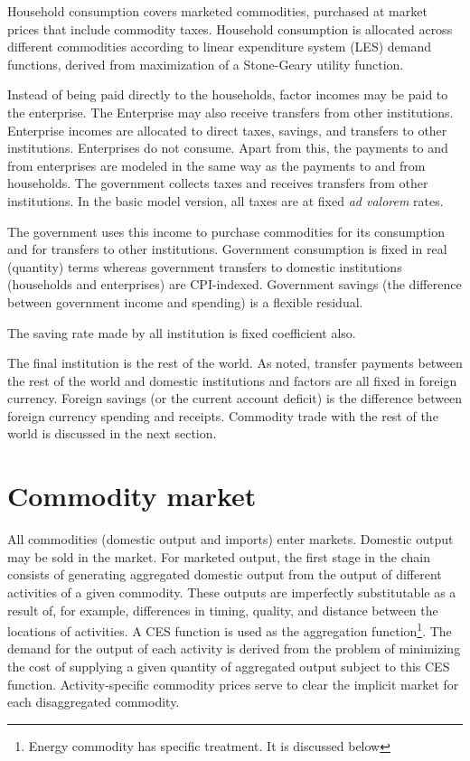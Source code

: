\documentclass[10pt,a4paper,titlepage,dvipdfmx]{book}
\begin{document}
Household consumption covers marketed commodities, purchased at market prices that include commodity taxes. Household consumption is allocated across different commodities according to linear expenditure system (LES) demand functions, derived from maximization of a Stone-Geary utility function.

Instead of being paid directly to the households, factor incomes may be paid to the enterprise. The Enterprise may also receive transfers from other institutions. Enterprise incomes are allocated to direct taxes, savings, and transfers to other institutions. Enterprises do not consume. Apart from this, the payments to and from enterprises are modeled in the same way as the payments to and from households. The government collects taxes and receives transfers from other institutions. In the basic model version, all taxes are at fixed \textit{ad valorem} rates. 

The government uses this income to purchase commodities for its consumption and for transfers to other institutions. Government consumption is fixed in real (quantity) terms whereas government transfers to domestic institutions (households and enterprises) are CPI-indexed. Government savings (the difference between government income and spending) is a flexible residual. 

The saving rate made by all institution is fixed coefficient also.

The final institution is the rest of the world. As noted, transfer payments between the rest of the world and domestic institutions and factors are all fixed in foreign currency. Foreign savings (or the current account deficit) is the difference between foreign currency spending and receipts. Commodity trade with the rest of the world is discussed in the next section. 

\section{\label{sec:ComMar}Commodity market}

All commodities (domestic output and imports) enter markets. Domestic output may be sold in the market. For marketed output, the first stage in the chain consists of generating aggregated domestic output from the output of different activities of a given commodity. These outputs are imperfectly substitutable as a result of, for example, differences in timing, quality, and distance between the locations of activities. A CES function is used as the aggregation function\footnote{Energy commodity has specific treatment. It is discussed below}. The demand for the output of each activity is derived from the problem of minimizing the cost of supplying a given quantity of aggregated output subject to this CES function. Activity-specific commodity prices serve to clear the implicit market for each disaggregated commodity. 
\end{document}
